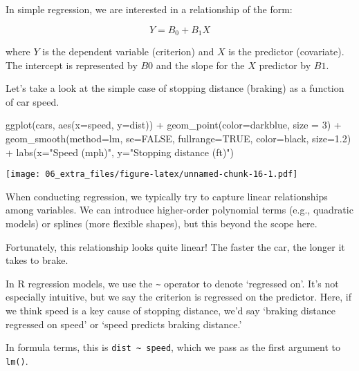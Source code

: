 \documentclass[
]{book}
\newenvironment{Shaded}{\begin{snugshade}}{\end{snugshade}}
\newcommand{\AttributeTok}[1]{\textcolor[rgb]{0.77,0.63,0.00}{#1}}
\newcommand{\ConstantTok}[1]{\textcolor[rgb]{0.00,0.00,0.00}{#1}}
\newcommand{\DecValTok}[1]{\textcolor[rgb]{0.00,0.00,0.81}{#1}}
\newcommand{\FloatTok}[1]{\textcolor[rgb]{0.00,0.00,0.81}{#1}}
\newcommand{\FunctionTok}[1]{\textcolor[rgb]{0.00,0.00,0.00}{#1}}
\newcommand{\NormalTok}[1]{#1}
\newcommand{\SpecialCharTok}[1]{\textcolor[rgb]{0.00,0.00,0.00}{#1}}
\newcommand{\StringTok}[1]{\textcolor[rgb]{0.31,0.60,0.02}{#1}}
\begin{document}
In simple regression, we are interested in a relationship of the form:

\[
Y = B_0 + B_1 X
\]

where \(Y\) is the dependent variable (criterion) and \(X\) is the predictor (covariate). The intercept is represented by \(B0\) and the slope for the \(X\) predictor by \(B1\).

Let's take a look at the simple case of stopping distance (braking) as a function of car speed.

\begin{Shaded}
\begin{Highlighting}[]
\FunctionTok{ggplot}\NormalTok{(cars, }\FunctionTok{aes}\NormalTok{(}\AttributeTok{x=}\NormalTok{speed, }\AttributeTok{y=}\NormalTok{dist)) }\SpecialCharTok{+} 
  \FunctionTok{geom\_point}\NormalTok{(}\AttributeTok{color=}\StringTok{\textquotesingle{}darkblue\textquotesingle{}}\NormalTok{, }\AttributeTok{size =} \DecValTok{3}\NormalTok{) }\SpecialCharTok{+} 
  \FunctionTok{geom\_smooth}\NormalTok{(}\AttributeTok{method=}\NormalTok{lm, }\AttributeTok{se=}\ConstantTok{FALSE}\NormalTok{, }\AttributeTok{fullrange=}\ConstantTok{TRUE}\NormalTok{, }\AttributeTok{color=}\StringTok{\textquotesingle{}black\textquotesingle{}}\NormalTok{, }\AttributeTok{size=}\FloatTok{1.2}\NormalTok{) }\SpecialCharTok{+}
  \FunctionTok{labs}\NormalTok{(}\AttributeTok{x=}\StringTok{"Speed (mph)"}\NormalTok{, }\AttributeTok{y=}\StringTok{"Stopping distance (ft)"}\NormalTok{)}
\end{Highlighting}
\end{Shaded}

\texttt{[image: 06\_extra\_files/figure-latex/unnamed-chunk-16-1.pdf]}

When conducting regression, we typically try to capture linear relationships among variables. We can introduce higher-order polynomial terms (e.g., quadratic models) or splines (more flexible shapes), but this beyond the scope here.

Fortunately, this relationship looks quite linear! The faster the car, the longer it takes to brake.

In R regression models, we use the \texttt{\textasciitilde{}} operator to denote `regressed on'. It's not especially intuitive, but we say the criterion is regressed on the predictor. Here, if we think speed is a key cause of stopping distance, we'd say `braking distance regressed on speed' or `speed predicts braking distance.'

In formula terms, this is \texttt{dist\ \textasciitilde{}\ speed}, which we pass as the first argument to \texttt{lm()}.
\end{document}
